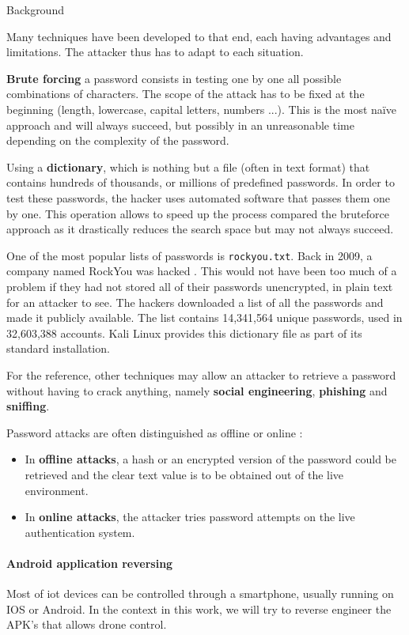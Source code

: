 \begin{chaptercover}{Background}
\begin{indentbox}{1cm}
Many techniques have been developed to that end, each having advantages and limitations. The attacker thus has to adapt to each situation.

\textbf{Brute forcing} a password consists in testing one by one all possible combinations of characters. The scope of the attack has to be fixed at the beginning (length, lowercase, capital letters, numbers ...). This is the most naïve approach and will always succeed, but possibly in an unreasonable time depending on the complexity of the password.

Using a \textbf{dictionary}, which is nothing but a file (often in text format) that contains hundreds of thousands, or millions of predefined passwords. In order to test these passwords, the hacker uses automated software that passes them one by one. This operation allows to speed up the process compared the bruteforce approach as it drastically reduces the search space but may not always succeed.

\begin{info}
One of the most popular lists of passwords is \texttt{rockyou.txt}. Back in 2009, a company named RockYou was hacked \cite{rockyou-hack}. This would not have been too much of a problem if they had not stored all of their passwords unencrypted, in plain text for an attacker to see. The hackers downloaded a list of all the passwords and made it publicly available. The list contains 14,341,564 unique passwords, used in 32,603,388 accounts. Kali Linux provides this dictionary file as part of its standard installation.
\end{info}

For the reference, other techniques may allow an attacker to retrieve a password without having to crack anything, namely \textbf{social engineering}, \textbf{phishing} and \textbf{sniffing}.

Password attacks are often distinguished as offline or online :
\begin{itemize}
  \item In \textbf{offline attacks}, a hash or an encrypted version of the password could be retrieved and the clear text value is to be obtained out of the live environment.
  \item In \textbf{online attacks}, the attacker tries password attempts on the live authentication system.
\end{itemize}
\end{indentbox}

\paragraph{Android application reversing} Most of \acrshort{iot} devices can be controlled through a smartphone, usually running on IOS or Android. In the context in this work, we will try to reverse engineer the APK's that allows drone control.


\end{chaptercover}
